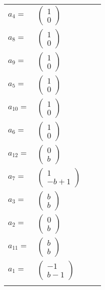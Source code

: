 \documentclass[1p]{elsarticle_modified}
\theoremstyle{definition}
\begin{document}
\begin{tabular}{m{7pt} m{180pt} m{7pt} m{180pt} }
\flushright $a_{4}=$&$\begin{pmatrix}1\\0\end{pmatrix}$ \\
\flushright $a_{8}=$&$\begin{pmatrix}1\\0\end{pmatrix}$ \\
\flushright $a_{9}=$&$\begin{pmatrix}1\\0\end{pmatrix}$ \\
\flushright $a_{5}=$&$\begin{pmatrix}1\\0\end{pmatrix}$ \\
\flushright $a_{10}=$&$\begin{pmatrix}1\\0\end{pmatrix}$ \\
\flushright $a_{6}=$&$\begin{pmatrix}1\\0\end{pmatrix}$ \\
\flushright $a_{12}=$&$\begin{pmatrix}0\\b\end{pmatrix}$ \\
\flushright $a_{7}=$&$\begin{pmatrix}1\\- b+1\end{pmatrix}$ \\
\flushright $a_{3}=$&$\begin{pmatrix}b\\b\end{pmatrix}$ \\
\flushright $a_{2}=$&$\begin{pmatrix}0\\b\end{pmatrix}$ \\
\flushright $a_{11}=$&$\begin{pmatrix}b\\b\end{pmatrix}$ \\
\flushright $a_{1}=$&$\begin{pmatrix}-1\\b-1\end{pmatrix}$\\&\end{tabular}
\end{document}
